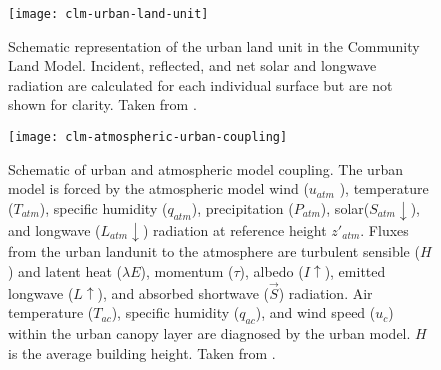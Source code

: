 		
				
		\begin{figure}	
			\centering
			\texttt{[image: clm-urban-land-unit]}
			\caption{
				Schematic representation of the urban land unit in the Community Land Model.
				Incident, reflected, and net solar and longwave radiation are calculated for each individual surface but are not shown for clarity.
				Taken from \textcite{Oleson2013}.
			}
			\label{fig:clm-urban-land-unit}
		\end{figure}
	
		\begin{figure}	
			\centering
			\texttt{[image: clm-atmospheric-urban-coupling]}
			\caption{
				Schematic of urban and atmospheric model coupling.
				The urban model is forced by 
					the atmospheric model wind ($u_{atm}$ ), 
					temperature ($T_{atm}$), 
					specific humidity ($q_{atm}$),
					precipitation ($P_{atm}$), 
					solar($S_{atm} \downarrow$), 
					and longwave ($L_{atm} \downarrow$) radiation 
					at reference height $z'_{atm}$.
				Fluxes from the urban landunit to the atmosphere are 
					turbulent sensible ($H$) 
					and latent heat ($\lambda E$), 
					momentum ($\tau$), 
					albedo ($I \uparrow$), 
					emitted longwave ($L \uparrow$), and 
					absorbed shortwave ($\vec{S}$) radiation. 
				Air temperature ($T_{ac}$), 
					specific humidity ($q_{ac}$), 
					and wind speed ($u_c$)
					within the urban canopy layer are diagnosed by the urban model.
				$H$ is the average building height.
				Taken from \textcite{Oleson2013}.
			}
			\label{fig:clm-atmospheric-urban-coupling}
		\end{figure}	
			

	


